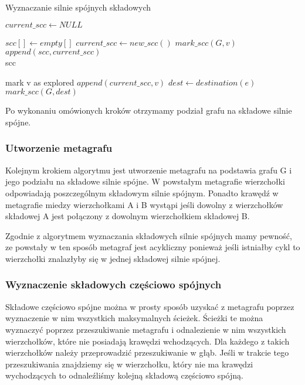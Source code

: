 \documentclass[a4paper,10pt]{article}
\begin{document}
\begin{algorithm}
\caption{Wyznaczanie silnie spójnych składowych}
\begin{algorithmic}
\State $current\_scc \leftarrow NULL $

\State $scc[] \leftarrow empty[]$
    \State $current\_scc \leftarrow new\_scc() $
    \State $mark\_scc(G, v)$
    \State $append(scc, current\_scc)$
  \EndIf
\EndFor\\
\Return scc
\EndFunction

  \State mark v as explored
  \State $append(current\_scc, v)$
    \State $dest \leftarrow destination(e)$
      \State $mark\_scc(G, dest)$
    \EndIf
  \EndFor
\EndFunction
\end{algorithmic}
\end{algorithm}

Po wykonaniu omówionych kroków otrzymamy podział grafu na składowe
silnie spójne.

\subsubsection{Utworzenie metagrafu}

Kolejnym krokiem algorytmu jest utworzenie metagrafu na podstawia
grafu G i jego podziału na składowe silnie spójne. W powstałym
metagrafie wierzchołki odpowiadają poszczególnym składowym silnie
spójnym. Ponadto krawędź w metagrafie miedzy wierzchołkami A i B
wystąpi jeśli dowolny z wierzchołków składowej A jest połączony z
dowolnym wierzchołkiem składowej B.

Zgodnie z algorytmem wyznaczania składowych silnie spójnych mamy
pewność, ze powstały w ten sposób metagraf jest acykliczny ponieważ
jeśli istniałby cykl to wierzchołki znalazłyby się w jednej składowej
silnie spójnej.

\subsubsection{Wyznaczenie składowych częściowo spójnych}

Składowe częściowo spójne można w prosty sposób uzyskać z metagrafu
poprzez wyznaczenie w nim wszystkich maksymalnych ścieżek. Ścieżki te
można wyznaczyć poprzez przeszukiwanie metagrafu i odnalezienie w nim
wszystkich wierzchołków, które nie posiadają krawędzi wchodzących. Dla
każdego z takich wierzchołków należy przeprowadzić przeszukiwanie w
głąb. Jeśli w trakcie tego przeszukiwania znajdziemy się w
wierzchołku, który nie ma krawędzi wychodzących to odnaleźliśmy
kolejną składową częściowo spójną.
\end{document}
